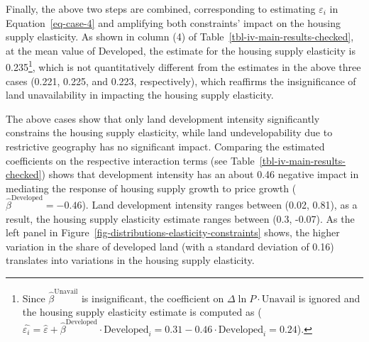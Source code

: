 \documentclass[
  12pt,
]{article}
\begin{document}
Finally, the above two steps are combined, corresponding to estimating
\(\varepsilon_i\) in Equation~\ref{eq-case-4} and amplifying both
constraints' impact on the housing supply elasticity. As shown in column
(4) of Table~\ref{tbl-iv-main-results-checked}, at the mean value of
\(\text{Developed}\), the estimate for the housing supply elasticity is
0.235\footnote{Since \(\widehat{\beta}^{\text{Unavail}}\) is
  insignificant, the coefficient on \(\Delta\ln P\cdot\text{Unavail}\)
  is ignored and the housing supply elasticity estimate is computed as
  (\(\widehat{\varepsilon_i} = \widehat{\varepsilon} + \widehat{\beta}^{\text{Developed}}\cdot\text{Developed}_i = 0.31 -0.46 \cdot\text{Developed}_i = 0.24\)).},
which is not quantitatively different from the estimates in the above
three cases (0.221, 0.225, and 0.223, respectively), which reaffirms the
insignificance of land unavailability in impacting the housing supply
elasticity.

The above cases show that only land development intensity significantly
constrains the housing supply elasticity, while land undevelopability
due to restrictive geography has no significant impact. Comparing the
estimated coefficients on the respective interaction terms (see
Table~\ref{tbl-iv-main-results-checked}) shows that development
intensity has an about 0.46 negative impact in mediating the response of
housing supply growth to price growth
(\(\widehat{\beta}^{\text{Developed}} = -0.46\)). Land development
intensity ranges between (0.02, 0.81), as a result, the housing supply
elasticity estimate ranges between (0.3, -0.07). As the left panel in
Figure~\ref{fig-distributions-elasticity-constraints} shows, the higher
variation in the share of developed land (with a standard deviation of
0.16) translates into variations in the housing supply elasticity.
\end{document}
